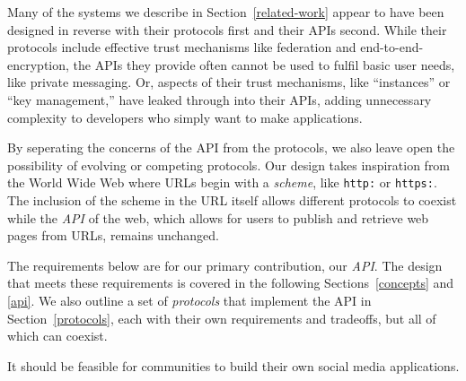 Many of the systems we describe in Section~\ref{related-work} appear to
have been designed in reverse with their protocols first and their APIs second.
While their protocols include effective trust mechanisms like federation and end-to-end-encryption,
the APIs they provide often cannot be used to fulfil basic user needs, like private messaging.
Or, aspects of their trust mechanisms,
like ``instances'' or ``key management,''
have leaked through into their APIs,
adding unnecessary complexity to developers
who simply want to make applications.

By seperating the concerns of the API from the protocols,
we also leave open the possibility of evolving or competing protocols.
Our design takes inspiration from the World Wide Web
where URLs begin with a \emph{scheme}, like \texttt{http:} or \texttt{https:}. The inclusion of the scheme
in the URL itself allows different protocols to coexist
while the \emph{API} of the web, which allows for users to publish and retrieve
web pages from URLs, remains unchanged.

The requirements below are for our primary contribution, our \emph{API}. The design that meets these
requirements is covered in the following Sections~\ref{concepts} and \ref{api}.
We also outline a set of \emph{protocols} that implement the API in Section~\ref{protocols}, each with their own
requirements and tradeoffs, but all of which can coexist.



\begin{requirement}
\label{requirements:easy}
   It should be feasible for communities to build
   their own social media applications.
\end{requirement}


